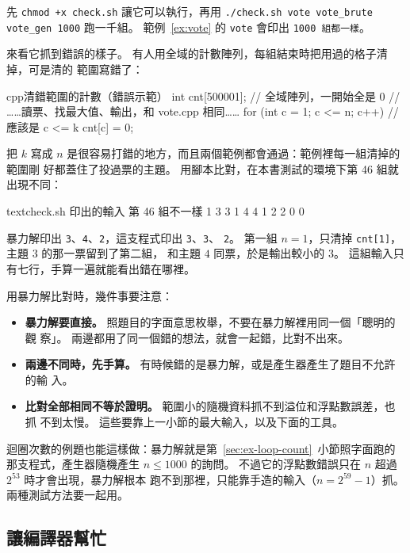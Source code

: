 先 \texttt{chmod +x check.sh} 讓它可以執行，再用 \texttt{./check.sh vote vote\_brute
vote\_gen 1000} 跑一千組。 範例~\ref{ex:vote} 的 \texttt{vote} 會印出
\texttt{1000 組都一樣}。

來看它抓到錯誤的樣子。 有人用全域的計數陣列，每組結束時把用過的格子清掉，可是清的
範圍寫錯了：

\begin{code}[label=code:vote-bug]{cpp}{清錯範圍的計數（錯誤示範）}
int cnt[500001];                          // 全域陣列，一開始全是 0
// ……讀票、找最大值、輸出，和 vote.cpp 相同……
for (int c = 1; c <= n; c++) {            // 應該是 c <= k
    cnt[c] = 0;
}
\end{code}

把 $k$ 寫成 $n$ 是很容易打錯的地方，而且兩個範例都會通過：範例裡每一組清掉的範圍剛
好都蓋住了投過票的主題。 用腳本比對，在本書測試的環境下第 46 組就出現不同：

\begin{code}{text}{check.sh 印出的輸入}
第 46 組不一樣
1 3
3
1 4
4
1 2
2
0 0
\end{code}

暴力解印出 \texttt{3}、\texttt{4}、\texttt{2}，這支程式印出 \texttt{3}、\texttt{3}、
\texttt{2}。 第一組 $n = 1$，只清掉 \texttt{cnt[1]}，主題 $3$ 的那一票留到了第二組，
和主題 $4$ 同票，於是輸出較小的 $3$。 這組輸入只有七行，手算一遍就能看出錯在哪裡。

用暴力解比對時，幾件事要注意：

\begin{itemize}
\item \textbf{暴力解要直接。} 照題目的字面意思枚舉，不要在暴力解裡用同一個「聰明的觀
察」。 兩邊都用了同一個錯的想法，就會一起錯，比對不出來。
\item \textbf{兩邊不同時，先手算。} 有時候錯的是暴力解，或是產生器產生了題目不允許的輸
入。
\item \textbf{比對全部相同不等於證明。} 範圍小的隨機資料抓不到溢位和浮點數誤差，也抓
不到太慢。 這些要靠上一小節的最大輸入，以及下面的工具。
\end{itemize}

迴圈次數的例題也能這樣做：暴力解就是第~\ref{sec:ex-loop-count}~小節照字面跑的那支程式，產生器隨機產生
$n \le 1000$ 的詢問。 不過它的浮點數錯誤只在 $n$ 超過 $2^{53}$ 時才會出現，暴力解根本
跑不到那裡，只能靠手造的輸入（$n = 2^{59} - 1$）抓。 兩種測試方法要一起用。

\subsection{讓編譯器幫忙}

